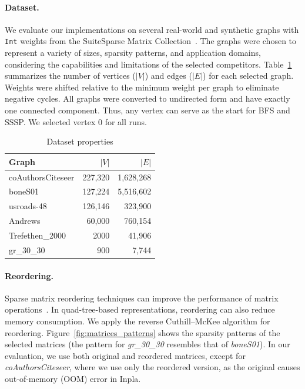 \paragraph{Dataset.}
We evaluate our implementations on several real-world and synthetic graphs with \texttt{Int} weights from the SuiteSparse Matrix Collection~\cite{Kolodziej2019}.
The graphs were chosen to represent a variety of sizes, sparsity patterns, and application domains, considering the capabilities and limitations of the selected competitors.
Table~\ref{tab:datasets} summarizes the number of vertices (\(|V|\)) and edges (\(|E|\)) for each selected graph.
Weights were shifted relative to the minimum weight per graph to eliminate negative cycles.
All graphs were converted to undirected form and have exactly one connected component.
Thus, any vertex can serve as the start for BFS and SSSP. 
We selected vertex 0 for all runs.
\begin{table}
\centering
\caption{Dataset properties}
\label{tab:datasets}
\begin{tabular}{l r r}
\hline
Graph & \(|V|\) & \(|E|\) \\
\hline
coAuthorsCiteseer & 227,320 & 1,628,268  \\
boneS01 & 127,224 & 5,516,602  \\
usroads-48 & 126,146 & 323,900 \\
Andrews & 60,000 & 760,154 \\
Trefethen\_2000 & 2000 & 41,906 \\
gr\_30\_30 & 900 & 7,744 \\
\hline
\end{tabular}
\end{table}

\paragraph{Reordering.} Sparse matrix reordering techniques can improve the performance of matrix operations~\cite{10.1145/3731599.3767441}.
In quad-tree-based representations, reordering can also reduce memory consumption.
We apply the reverse Cuthill--McKee algorithm for reordering.
Figure~\ref{fig:matrices_patterns} shows the sparsity patterns of the selected matrices (the pattern for \emph{gr\_30\_30} resembles that of \emph{boneS01}). 
In our evaluation, we use both original and reordered matrices, except for \emph{coAuthorsCiteseer}, where we use only the reordered version, as the original causes out-of-memory (OOM) error in Inpla.

